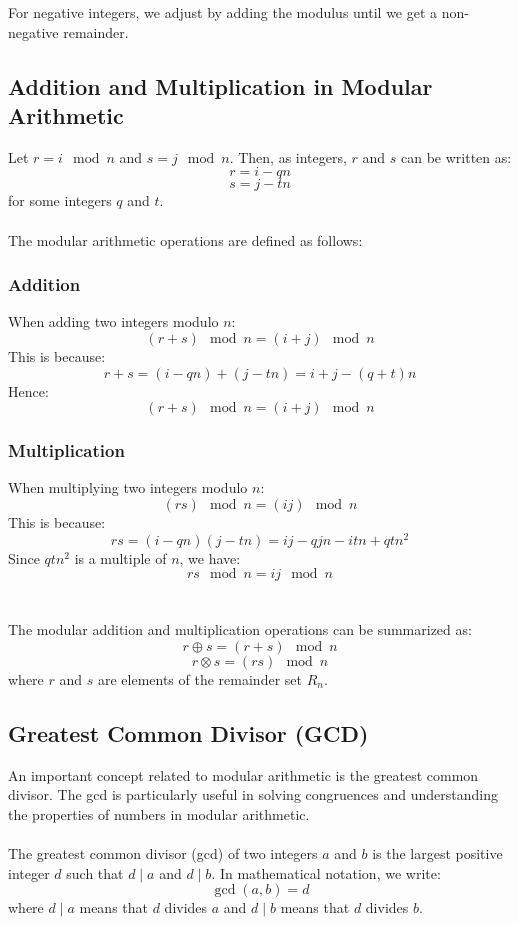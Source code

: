 \documentclass[11pt, letterpaper]{article}
\begin{document}
For negative integers, we adjust by adding the modulus until we get a non-negative remainder.

\subsection{Addition and Multiplication in Modular Arithmetic}
Let \( r = i \mod n \) and \( s = j \mod n \). Then, as integers, \( r \) and \( s \) can be written as:
\[
r = i - qn
\]
\[
s = j - tn
\]
for some integers \( q \) and \( t \). 
\\ \\
The modular arithmetic operations are defined as follows:

\subsubsection*{Addition}
When adding two integers modulo \( n \):
\[
(r + s) \mod n = (i + j) \mod n
\]
This is because:
\[
r + s = (i - qn) + (j - tn) = i + j - (q + t)n
\]
Hence:
\[
(r + s) \mod n = (i + j) \mod n
\]

\subsubsection*{Multiplication}
When multiplying two integers modulo \( n \):
\[
(rs) \mod n = (ij) \mod n
\]
This is because:
\[
rs = (i - qn)(j - tn) = ij - qjn - itn + qtn^2
\]
Since \( qtn^2 \) is a multiple of \( n \), we have:
\[
rs \mod n = ij \mod n
\]
\\ \\
The modular addition and multiplication operations can be summarized as:
\[
r \oplus s = (r + s) \mod n
\]
\[
r \otimes s = (rs) \mod n
\]
where \( r \) and \( s \) are elements of the remainder set \( R_n \).

\subsection{Greatest Common Divisor (GCD)}
An important concept related to modular arithmetic is the greatest common divisor. The gcd is particularly useful in solving congruences and understanding the properties of numbers in modular arithmetic.
\\ \\
The greatest common divisor (gcd) of two integers \(a\) and \(b\) is the largest positive integer \(d\) such that \(d \mid a\) and \(d \mid b\). In mathematical notation, we write:
\[
\gcd(a, b) = d
\]
where \(d \mid a\) means that \(d\) divides \(a\) and \(d \mid b\) means that \(d\) divides \(b\).
\end{document}
